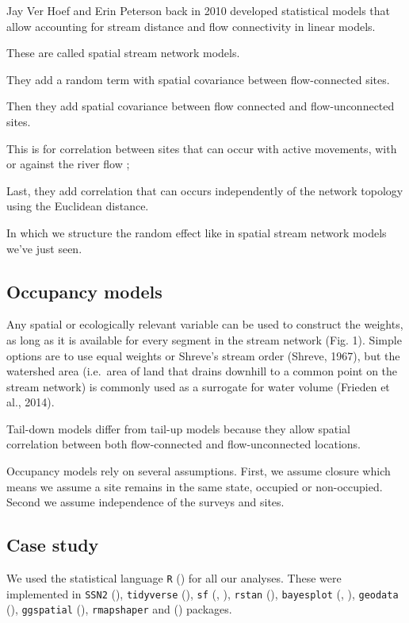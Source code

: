 \documentclass[
  11pt,
  a4paper,
]{article}
\begin{document}
Jay Ver Hoef and Erin Peterson back in 2010 developed statistical models that allow accounting for stream distance and flow connectivity in linear models.

These are called spatial stream network models.

They add a random term with spatial covariance between flow-connected sites.

Then they add spatial covariance between flow connected and flow-unconnected sites.

This is for correlation between sites that can occur with active movements, with or against the river flow ;

Last, they add correlation that can occurs independently of the network topology using the Euclidean distance.

In which we structure the random effect like in spatial stream network models we've just seen.

\subsection{Occupancy models}\label{occupancy-models}

Any spatial or ecologically relevant variable can be used to construct the weights, as long as it is available for every segment in the stream network (Fig. 1). Simple options are to use equal weights or Shreve's stream order (Shreve, 1967), but the watershed area (i.e.~area of land that drains downhill to a common point on the stream network) is commonly used as a surrogate for water volume (Frieden et al., 2014).

Tail-down models differ from tail-up models because they allow spatial correlation between both flow-connected and flow-unconnected locations.

Occupancy models rely on several assumptions.
First, we assume closure which means we assume a site remains in the same state, occupied or non-occupied.
Second we assume independence of the surveys and sites.

\subsection{Case study}\label{case-study}

We used the statistical language \texttt{R} () for all our analyses. These were implemented in \texttt{SSN2} (), \texttt{tidyverse} (), \texttt{sf} (, ), \texttt{rstan} (), \texttt{bayesplot} (, ), \texttt{geodata} (), \texttt{ggspatial} (), \texttt{rmapshaper} and () packages.
\end{document}
